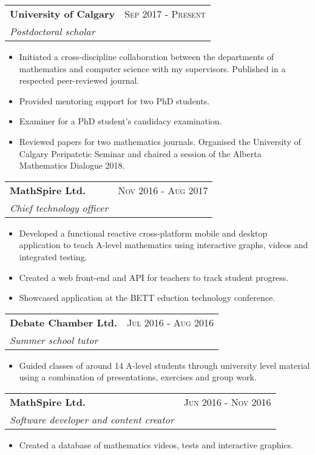 \documentclass[a4paper,10pt]{article}
\begin{document}
\begin{tabu}{X[1, l]X[1 r]}
{\bf University of Calgary}&\textsc{Sep 2017 - Present}\\
\emph{Postdoctoral scholar}  
\end{tabu}
\begin{itemize}
  \item Initiated a cross-discipline collaboration between the departments of mathematics and computer science with my supervisors.
  Published in a respected peer-reviewed journal.
  \item Provided mentoring support for two PhD students.
  \item Examiner for a PhD student's candidacy examination.
  \item Reviewed papers for two mathematics journals. Organised the University of Calgary Peripatetic Seminar and chaired a session of the Alberta Mathematics Dialogue 2018.
\end{itemize}

\begin{tabu}{X[1, l]X[1 r]}
{\bf MathSpire Ltd.}&\textsc{Nov 2016 - Aug 2017}\\
\emph{Chief technology officer}  
\end{tabu}
\begin{itemize}
  \item Developed a functional reactive cross-platform mobile and desktop application to teach A-level mathematics using interactive graphs, videos and integrated testing.
  \item Created a web front-end and API for teachers to track student progress.
  \item Showcased application at the BETT eduction technology conference.
\end{itemize}

\begin{tabu}{X[1, l]X[1 r]}
{\bf Debate Chamber Ltd.}&\textsc{Jul 2016 - Aug 2016}\\
\emph{Summer school tutor}  
\end{tabu}
\begin{itemize}
  \item Guided classes of around 14 A-level students through university level material using a combination of presentations, exercises and group work.
\end{itemize}

\begin{tabu}{X[1, l]X[1 r]}
{\bf MathSpire Ltd.}&\textsc{Jun 2016 - Nov 2016}\\
\emph{Software developer and content creator}  
\end{tabu}
\begin{itemize}
  \item Created a database of mathematics videos, tests and interactive graphics.
\end{itemize}
\end{document}
